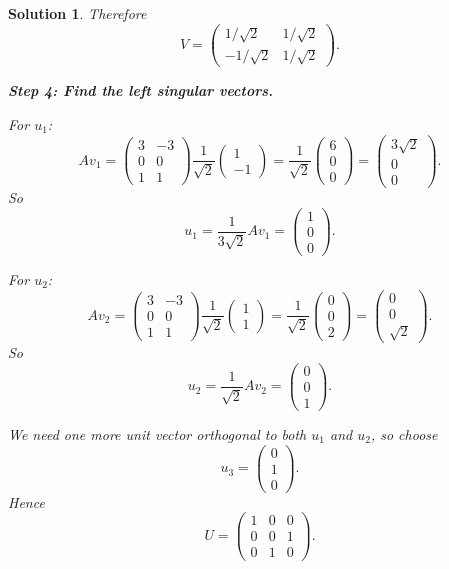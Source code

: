 \documentclass[11pt,a4paper]{article}
\theoremstyle{sol}
\newtheorem*{solution}{Solution}
\begin{document}
\begin{solution}
Therefore
\[
V=
\begin{pmatrix}
1/\sqrt2&1/\sqrt2\\
-1/\sqrt2&1/\sqrt2
\end{pmatrix}.
\]

\textbf{Step 4: Find the left singular vectors.}

For $u_1$:
\[
Av_1=
\begin{pmatrix}
3&-3\\
0&0\\
1&1
\end{pmatrix}
\frac{1}{\sqrt2}\begin{pmatrix}1\\-1\end{pmatrix}
=\frac{1}{\sqrt2}\begin{pmatrix}6\\0\\0\end{pmatrix}
=\begin{pmatrix}3\sqrt2\\0\\0\end{pmatrix}.
\]
So
\[
u_1=\frac{1}{3\sqrt2}Av_1
=\begin{pmatrix}1\\0\\0\end{pmatrix}.
\]

For $u_2$:
\[
Av_2=
\begin{pmatrix}
3&-3\\
0&0\\
1&1
\end{pmatrix}
\frac{1}{\sqrt2}\begin{pmatrix}1\\1\end{pmatrix}
=\frac{1}{\sqrt2}\begin{pmatrix}0\\0\\2\end{pmatrix}
=\begin{pmatrix}0\\0\\\sqrt2\end{pmatrix}.
\]
So
\[
u_2=\frac{1}{\sqrt2}Av_2
=\begin{pmatrix}0\\0\\1\end{pmatrix}.
\]

We need one more unit vector orthogonal to both $u_1$ and $u_2$, so choose
\[
u_3=\begin{pmatrix}0\\1\\0\end{pmatrix}.
\]
Hence
\[
U=
\begin{pmatrix}
1&0&0\\
0&0&1\\
0&1&0
\end{pmatrix}.
\]


\end{solution}
\end{document}
